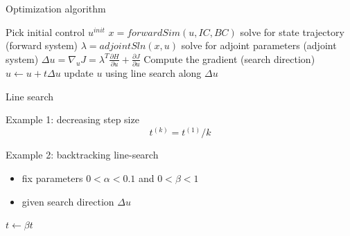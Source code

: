 \documentclass[xcolor=svgnames, english, smaller]{beamer}
\theoremstyle{plain}
\theoremstyle{definition}
\theoremstyle{plain}
\theoremstyle{plain}
\begin{document}
\begin{frame}{Optimization algorithm}

\begin{algorithm}[H]

\begin{spacing}{1.3}
\begin{algorithmic}
\State Pick initial control $u^{init}$
\State $x = forwardSim(u,IC, BC)$ \hfill solve for state trajectory (forward system)
\State $\lambda = adjointSln(x,u)$ \hfill solve for adjoint parameters (adjoint system)
\State $\Delta u = \nabla_u J = \lambda^T \frac{\partial H}{\partial u} + \frac{\partial J}{\partial u}$ \hfill Compute the gradient (search direction)
\State $ u \gets u + t \Delta u $ \hfill update $u$ using line search along $\Delta u$
\EndWhile
\end{algorithmic}
\end{spacing}

\caption{Gradient descent loop}
\end{algorithm}

\end{frame}


\begin{frame}{Line search}

Example 1: decreasing step size
\[
t^{(k)} = t^{(1)} /k 
\]


Example 2: backtracking line-search
\begin{itemize}
\item fix parameters $ 0 < \alpha < 0.1$ and $0 < \beta < 1$
\item given search direction $\Delta u$
\end{itemize}

\begin{algorithm}[H]
\begin{algorithmic}
\State $t \gets \beta t$
\EndWhile
\end{algorithmic}
\caption{Backtracking line search}
\end{algorithm}

\end{frame}


\end{document}
